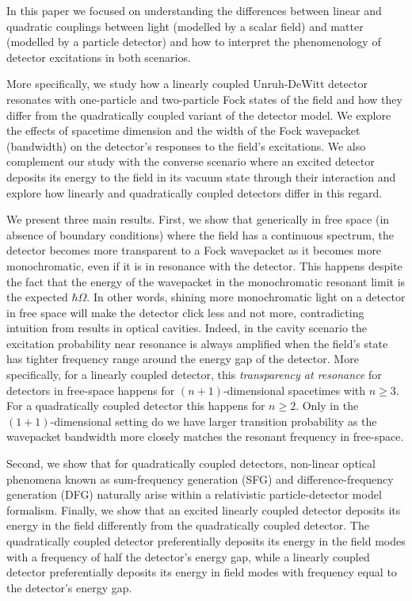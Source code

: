 \documentclass[prd,twocolumn,superscriptaddress,nofootinbib,floatfix,amsmath,amssymb]{revtex4-2}
\begin{document}
    
    
    
    
    
    
    
    In this paper we focused on understanding the differences between linear and quadratic couplings between light (modelled by a scalar field) and matter (modelled by a particle detector) and how to interpret the phenomenology of detector excitations in both scenarios.
    
    More specifically, we study how a linearly coupled Unruh-DeWitt detector resonates with one-particle and two-particle Fock states of the field and how they differ from the quadratically coupled variant of the detector model. We explore the effects of spacetime dimension and the width of the Fock wavepacket (bandwidth) on the detector's responses to the field's excitations. We also complement our study with the converse scenario where an excited detector deposits its energy to the field in its vacuum state through their interaction and explore how linearly and quadratically coupled detectors differ in this regard.
    
    We present three main results. First, we show that generically in free space (in absence of boundary conditions) where the field has a continuous spectrum, the detector becomes more transparent to a Fock wavepacket as it becomes more monochromatic, even if it is in resonance with the detector. This happens despite the fact that the energy of the wavepacket in the monochromatic resonant limit is the expected $\hbar \Omega$. In other words, shining more monochromatic light on a detector in free space will make the detector click less and not more, contradicting intuition from results in optical cavities. Indeed, in the cavity  scenario the excitation probability near resonance is always amplified when the field's state has tighter frequency range around the energy gap of the detector. More specifically, for a linearly coupled detector, this \textit{transparency at resonance} for detectors in free-space happens for $(n+1)$-dimensional spacetimes with $n\geq 3$. For a quadratically coupled detector this happens for $n\geq 2$. Only in the $(1+1)$-dimensional setting do we have larger transition probability as the wavepacket bandwidth more closely matches the resonant frequency in free-space.
    
    Second, we show that for quadratically coupled detectors, non-linear optical phenomena known as sum-frequency generation (SFG) and difference-frequency generation (DFG) naturally arise within a relativistic particle-detector model formalism. Finally, we show that an excited linearly coupled detector deposits its energy in the field differently from the quadratically coupled detector. The quadratically coupled detector preferentially deposits its energy in the field modes with a frequency of {half} the detector's energy gap, while a linearly coupled detector preferentially deposits its energy in field modes with frequency equal to the detector's energy gap.
    
\end{document}
